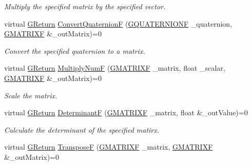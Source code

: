 \begin{DoxyCompactItemize}
\begin{DoxyCompactList}\small\item\em Multiply the specified matrix by the specified vector. \end{DoxyCompactList}\item 
virtual \mbox{\hyperlink{namespace_g_w_a67a839e3df7ea8a5c5686613a7a3de21}{G\+Return}} \mbox{\hyperlink{class_g_w_1_1_m_a_t_h_1_1_g_matrix_aded7d8a4b4cd54c3fc7f43bab1ed0730}{Convert\+QuaternionF}} (\mbox{\hyperlink{struct_g_w_1_1_m_a_t_h_1_1_g_q_u_a_t_e_r_n_i_o_n_f}{G\+Q\+U\+A\+T\+E\+R\+N\+I\+O\+NF}} \+\_\+quaternion, \mbox{\hyperlink{struct_g_w_1_1_m_a_t_h_1_1_g_m_a_t_r_i_x_f}{G\+M\+A\+T\+R\+I\+XF}} \&\+\_\+out\+Matrix)=0
\begin{DoxyCompactList}\small\item\em Convert the specified quaternion to a matrix. \end{DoxyCompactList}\item 
virtual \mbox{\hyperlink{namespace_g_w_a67a839e3df7ea8a5c5686613a7a3de21}{G\+Return}} \mbox{\hyperlink{class_g_w_1_1_m_a_t_h_1_1_g_matrix_ab2560c150812cd88dd631e533ea5f9dc}{Multiply\+NumF}} (\mbox{\hyperlink{struct_g_w_1_1_m_a_t_h_1_1_g_m_a_t_r_i_x_f}{G\+M\+A\+T\+R\+I\+XF}} \+\_\+matrix, float \+\_\+scalar, \mbox{\hyperlink{struct_g_w_1_1_m_a_t_h_1_1_g_m_a_t_r_i_x_f}{G\+M\+A\+T\+R\+I\+XF}} \&\+\_\+out\+Matrix)=0
\begin{DoxyCompactList}\small\item\em Scale the matrix. \end{DoxyCompactList}\item 
virtual \mbox{\hyperlink{namespace_g_w_a67a839e3df7ea8a5c5686613a7a3de21}{G\+Return}} \mbox{\hyperlink{class_g_w_1_1_m_a_t_h_1_1_g_matrix_a8ae14af67e2b099569a4439b7497b37d}{DeterminantF}} (\mbox{\hyperlink{struct_g_w_1_1_m_a_t_h_1_1_g_m_a_t_r_i_x_f}{G\+M\+A\+T\+R\+I\+XF}} \+\_\+matrix, float \&\+\_\+out\+Value)=0
\begin{DoxyCompactList}\small\item\em Calculate the determinant of the specified matirx. \end{DoxyCompactList}\item 
virtual \mbox{\hyperlink{namespace_g_w_a67a839e3df7ea8a5c5686613a7a3de21}{G\+Return}} \mbox{\hyperlink{class_g_w_1_1_m_a_t_h_1_1_g_matrix_ae1865f48ec9187b508cbcfe083496581}{TransposeF}} (\mbox{\hyperlink{struct_g_w_1_1_m_a_t_h_1_1_g_m_a_t_r_i_x_f}{G\+M\+A\+T\+R\+I\+XF}} \+\_\+matrix, \mbox{\hyperlink{struct_g_w_1_1_m_a_t_h_1_1_g_m_a_t_r_i_x_f}{G\+M\+A\+T\+R\+I\+XF}} \&\+\_\+out\+Matrix)=0

\end{DoxyCompactItemize}
